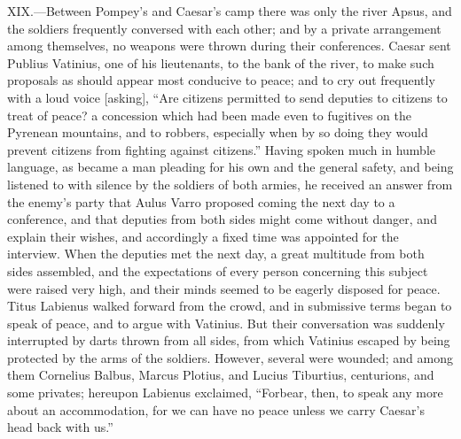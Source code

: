 XIX.—Between Pompey's and Caesar's camp there was only the river Apsus,
and the soldiers frequently conversed with each other; and by a private
arrangement among themselves, no weapons were thrown during their
conferences. Caesar sent Publius Vatinius, one of his lieutenants, to
the bank of the river, to make such proposals as should appear most
conducive to peace; and to cry out frequently with a loud voice
[asking], ``Are citizens permitted to send deputies to citizens to treat
of peace? a concession which had been made even to fugitives on the
Pyrenean mountains, and to robbers, especially when by so doing they
would prevent citizens from fighting against citizens.'' Having spoken
much in humble language, as became a man pleading for his own and the
general safety, and being listened to with silence by the soldiers of
both armies, he received an answer from the enemy's party that Aulus
Varro proposed coming the next day to a conference, and that deputies
from both sides might come without danger, and explain their wishes, and
accordingly a fixed time was appointed for the interview. When the
deputies met the next day, a great multitude from both sides assembled,
and the expectations of every person concerning this subject were raised
very high, and their minds seemed to be eagerly disposed for peace.
Titus Labienus walked forward from the crowd, and in submissive terms
began to speak of peace, and to argue with Vatinius. But their
conversation was suddenly interrupted by darts thrown from all sides,
from which Vatinius escaped by being protected by the arms of the
soldiers. However, several were wounded; and among them Cornelius
Balbus, Marcus Plotius, and Lucius Tiburtius, centurions, and some
privates; hereupon Labienus exclaimed, ``Forbear, then, to speak any more
about an accommodation, for we can have no peace unless we carry
Caesar's head back with us.''

